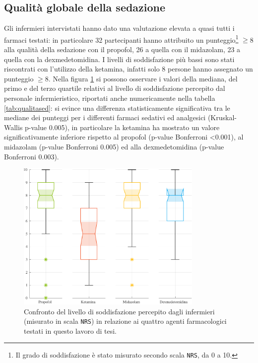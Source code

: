 \subsection*{Qualità globale della sedazione}
Gli infermieri intervistati hanno dato una valutazione elevata a quasi tutti i farmaci testati: in particolare 32 partecipanti hanno attribuito un punteggio\footnote{Il grado di soddisfazione è stato misurato secondo scala \texttt{NRS}, da 0 a 10.} $\geq$8 alla qualità della sedazione con il propofol, 26 a quella con il midazolam, 23 a quella con la dexmedetomidina. I livelli di soddisfazione più bassi sono stati riscontrati con l'utilizzo della ketamina, infatti solo 8 persone hanno assegnato un punteggio $\geq$8. Nella figura \ref{fig:qualitascolorful} si possono osservare i valori della mediana, del primo e del terzo quartile relativi al livello di soddisfazione percepito dal personale infermieristico, riportati anche numericamente nella tabella \ref{tab:qualitased}: si evince una differenza statisticamente significativa tra le mediane dei punteggi per i differenti farmaci sedativi ed analgesici (Kruskal-Wallis p-value 0.005), in particolare la ketamina ha mostrato un valore significativamente inferiore rispetto al propofol (p-value Bonferroni <0.001), al midazolam (p-value Bonferroni 0.005) ed alla dexmedetomidina (p-value Bonferroni 0.003).

\begin{figure}[h]
    \centering
    \includegraphics[width=0.8\textwidth]{Figure/qualita-colorful.pdf}
    \caption{Confronto del livello di soddisfazione percepito dagli infermieri (misurato in scala \texttt{NRS}) in relazione ai quattro agenti farmacologici testati in questo lavoro di tesi.}
    \label{fig:qualitascolorful}
\end{figure}

